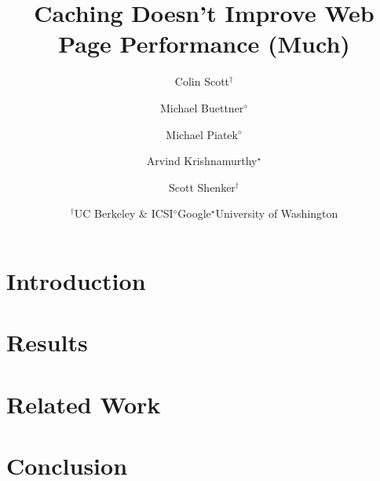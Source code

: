 \documentclass[letterpaper,10pt,twocolumn]{article}
\title{Caching Doesn't Improve Web Page Performance (Much)}
\author{
\rm Colin Scott$^\dagger$ \hspace{-7mm}
\and \rm Michael Buettner$^\diamond$ \hspace{-7mm}
\and \rm Michael Piatek$^\diamond$ \hspace{-7mm}
\and \rm Arvind Krishnamurthy$^\star$ \hspace{-7mm}
\and \rm Scott Shenker$^\dagger$ \\
\and {\begin{tabular}{ccc}$^\dagger$UC Berkeley \& ICSI & $^\diamond$Google &
$^\star$University of Washington\end{tabular}}}
\begin{document}
   \date{}
   \maketitle
   \thispagestyle{empty}

\section{Introduction}
\label{sec:intro}


\section{Results}
\label{sec:results}


\section{Related Work}
\label{sec:related_work}


\section{Conclusion}
\label{sec:conclusion}



%

\end{document}
